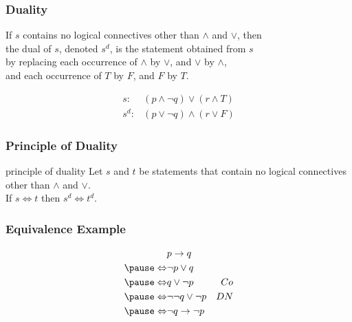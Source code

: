 \documentclass[dvipsnames]{beamer}
\begin{document}
\begin{frame}
  \frametitle{Duality}

  \begin{definition}
    If $s$ contains no logical connectives other than $\wedge$ and $\vee$, then\\
    the \alert{dual} of $s$, denoted $s^d$, is the statement obtained from $s$\\
    by replacing each occurrence of $\wedge$ by $\vee$, and $\vee$ by $\wedge$,\\
    and each occurrence of $T$ by $F$, and $F$ by $T$.
  \end{definition}

  \pause
  \begin{example}
    \begin{eqnarray*}
      s:   & (p \wedge \neg q) \vee (r \wedge T)\\
      s^d: & (p \vee \neg q) \wedge (r \vee F)
    \end{eqnarray*}
  \end{example}
\end{frame}

\begin{frame}
  \frametitle{Principle of Duality}

  \begin{block}{principle of duality}
    Let $s$ and $t$ be statements that contain no logical connectives\\
    other than $\wedge$ and $\vee$.\\
    If $s \Leftrightarrow t$ then $s^d \Leftrightarrow t^d$.
  \end{block}
\end{frame}

\begin{frame}
  \frametitle{Equivalence Example}

  \begin{example}
    \begin{eqnarray*}
                      & p \rightarrow q           &\\
      \pause
      \Leftrightarrow & \neg p \vee q             &\\
      \pause
      \Leftrightarrow & q \vee \neg p             & Co\\
      \pause
      \Leftrightarrow & \neg \neg q \vee \neg p   & DN\\
      \pause
      \Leftrightarrow & \neg q \rightarrow \neg p &
    \end{eqnarray*}
  \end{example}
\end{frame}
\end{document}
